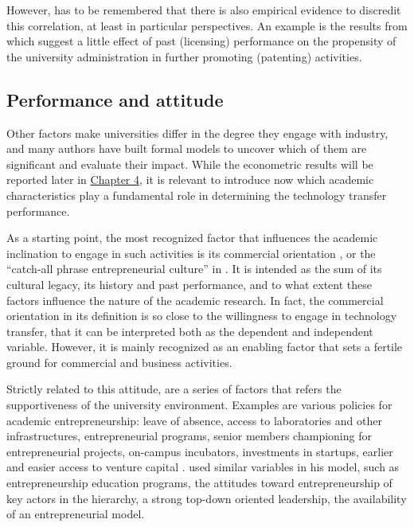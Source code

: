 However, has to be remembered that there is also empirical evidence to discredit this correlation, at least in particular perspectives. An example is the results from \citet{Thursby2002} which suggest a little effect of past (licensing) performance on the propensity of the university administration in further promoting (patenting) activities.


\subsection{Performance and attitude}

Other factors make universities differ in the degree they engage with industry, and many authors have built formal models to uncover which of them are significant and evaluate their impact. While the econometric results will be reported later in \hyperref[Chapter4]{Chapter 4}, it is relevant to introduce now which academic characteristics play a fundamental role in determining the technology transfer performance.

As a starting point, the most recognized factor that influences the academic inclination to engage in such activities is its commercial orientation \citep{DEste2007}, or the \enquote{catch-all phrase entrepreneurial culture} in \citet{OwenSmith2001}. It is intended as the sum of its cultural legacy, its history and past performance, and to what extent these factors influence the nature of the academic research. In fact, the commercial orientation in its definition is so close to the willingness to engage in technology transfer, that it can be interpreted both as the dependent and independent variable. However, it is mainly recognized as an enabling factor that sets a fertile ground for commercial and business activities. 

Strictly related to this attitude, are a series of factors that refers the supportiveness of the university environment. Examples are various policies for academic entrepreneurship: leave of absence, access to laboratories and other infrastructures, entrepreneurial programs, senior members championing for entrepreneurial projects, on-campus incubators, investments in startups, earlier and easier access to venture capital \citep{Baldini2007}. \citet{Guerrero2014} used similar variables in his model, such as entrepreneurship education programs, the attitudes toward entrepreneurship of key actors in the hierarchy, a strong top-down oriented leadership, the availability of an entrepreneurial model.

